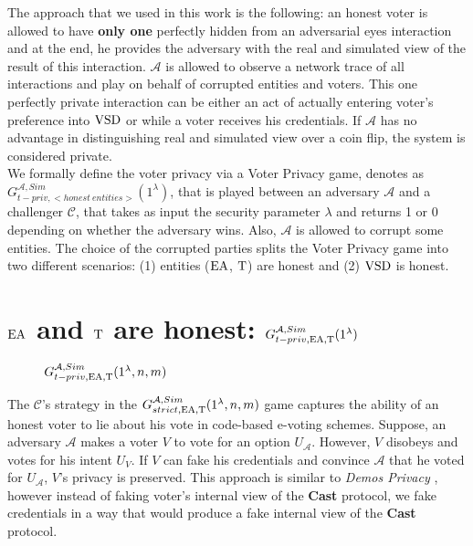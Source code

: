 The approach that we used in this work is the following: an honest voter is allowed to have  \textbf{only one} perfectly hidden from an adversarial eyes interaction and at the end, he provides the adversary with the real and simulated view of the result of this interaction. $\mathcal{A}$ is allowed to observe a network trace of all interactions and play on behalf of corrupted entities and voters. This one perfectly private interaction can be either an act of actually entering voter's preference into $\operatorname{VSD}$ or while a voter receives his credentials. If $\mathcal{A}$  has no advantage in distinguishing real and simulated view over a coin flip, the system is considered private. \\

We formally define the voter privacy via a Voter Privacy game, denotes as $G_{t-priv,<honest~entities>}^{\mathcal{A}, Sim}(1^{\lambda})$, that is played between an adversary $\mathcal{A}$ and a challenger $\mathcal{C}$, that takes as input the security parameter $\lambda$ and returns 1 or 0 depending on whether the adversary wins.  Also, $\mathcal{A}$ is  allowed to corrupt some entities. The choice of the corrupted parties splits the Voter Privacy game into two different scenarios: (1) entities ($\operatorname{EA}$, $\operatorname{T}$) are honest and (2) $\operatorname{VSD}$ is honest. \\

 \section{$\operatorname{EA}$ and $\operatorname{T}$ are honest: $G_{t-priv,\operatorname{EA},\operatorname{T}}^{\mathcal{A}, Sim}(1^{\lambda})$}
  \begin{figure}
 
        \caption{  $G_{t-priv,\operatorname{EA},\operatorname{T}}^{\mathcal{A}, Sim}(1^{\lambda},n,m)$}
\end{figure}

The $\mathcal{C}$'s strategy  in the  $G_{strict,\operatorname{EA},\operatorname{T}}^{\mathcal{A}, Sim}(1^{\lambda},n,m)$ game captures the ability of an honest voter to lie about his vote in code-based e-voting schemes. Suppose, an adversary $\mathcal{A}$ makes a voter $V$ to vote for an option $U_{\mathcal{A}}$.  However, $V$ disobeys and votes for his intent $U_{V}$. If $V$ can fake his credentials  and convince $\mathcal{A}$ that he voted for $U_{\mathcal{A}}$, $V$'s privacy is preserved. This approach is similar to \textit{Demos Privacy} \cite{Kiayias2015}, however instead of faking voter's internal view of the \textbf{Cast} protocol, we fake credentials in a way that would produce a fake internal view of the \textbf{Cast} protocol.\\

